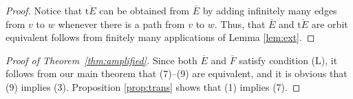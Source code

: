 \documentclass[12pt, a4paper]{amsart}
\numberwithin{equation}{section}
\theoremstyle{definition}
\theoremstyle{remark}
\begin{document}
\begin{proof}
	Notice that ${\overline{\mathrm{t}{E}}}$ can be obtained from $\overline{E}$ by adding 
	infinitely many edges from $v$ to $w$ whenever there is a path from $v$ to 
	$w$. Thus, that $\overline{E}$ and ${\overline{\mathrm{t}{E}}}$ are orbit equivalent follows 
	from finitely many applications of Lemma \ref{lem:ext}.
\end{proof}

\begin{proof}[Proof of Theorem~\ref{thm:amplified}]
	Since both $\overline{E}$ and $\overline{F}$ satisfy condition (L), it 
	follows from our main theorem that (7)--(9) are equivalent, and it is 
	obvious that (9) implies (3). Proposition \ref{prop:trans} shows that (1) 
	implies (7).
\end{proof}
\end{document}
